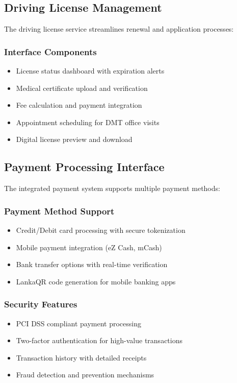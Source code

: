 \documentclass[12pt,a4paper]{article}
\begin{document}
\subsection{Driving License Management}

The driving license service streamlines renewal and application processes:

\subsubsection{Interface Components}
\begin{itemize}
    \item License status dashboard with expiration alerts
    \item Medical certificate upload and verification
    \item Fee calculation and payment integration
    \item Appointment scheduling for DMT office visits
    \item Digital license preview and download
\end{itemize}

\subsection{Payment Processing Interface}

The integrated payment system supports multiple payment methods:

\subsubsection{Payment Method Support}
\begin{itemize}
    \item Credit/Debit card processing with secure tokenization
    \item Mobile payment integration (eZ Cash, mCash)
    \item Bank transfer options with real-time verification
    \item LankaQR code generation for mobile banking apps
\end{itemize}

\subsubsection{Security Features}
\begin{itemize}
    \item PCI DSS compliant payment processing
    \item Two-factor authentication for high-value transactions
    \item Transaction history with detailed receipts
    \item Fraud detection and prevention mechanisms
\end{itemize}
\end{document}

